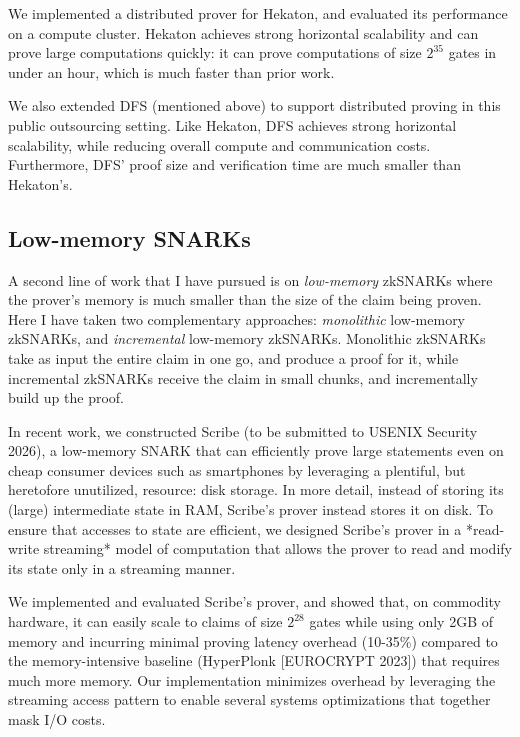\documentclass[11pt,letterpaper]{article}
\theoremstyle{definition} %
\theoremstyle{remark} %
\begin{document}
We implemented a distributed prover for Hekaton, and evaluated its performance on a compute cluster. Hekaton achieves strong horizontal scalability and can prove large computations quickly: it can prove computations of size $2^{35}$  gates in under an hour, which is much faster than prior work.

We also extended DFS (mentioned above) to support distributed proving in this public outsourcing setting. Like Hekaton, DFS achieves strong horizontal scalability, while reducing overall compute and communication costs.
Furthermore, DFS' proof size and verification time are much smaller than Hekaton's.


\subsection{Low-memory SNARKs}

A second line of work that I have pursued is on \emph{low-memory} zkSNARKs where the prover's memory is much smaller than the size of the claim being proven.
Here I have taken two complementary approaches: \emph{monolithic} low-memory zkSNARKs, and \emph{incremental} low-memory zkSNARKs.
Monolithic zkSNARKs take as input the entire claim in one go, and produce a proof for it, while incremental zkSNARKs receive the claim in small chunks, and incrementally build up the proof.

In recent work, we constructed Scribe (to be submitted to USENIX Security 2026), a low-memory SNARK that can efficiently prove large statements even on cheap consumer devices such as smartphones by leveraging a plentiful, but heretofore unutilized, resource: disk storage. 
In more detail, instead of storing its (large) intermediate state in RAM, Scribe's prover instead stores it on disk. 
To ensure that accesses to state are efficient, we designed Scribe's prover in a *read-write streaming* model of computation that allows the prover to read and modify its state only in a streaming manner.

We implemented and evaluated Scribe's prover, and showed that, on commodity hardware, it can easily scale to claims of size $2^{28}$ gates while using only 2GB of memory and incurring minimal proving latency overhead (10-35\%) compared to the memory-intensive baseline (HyperPlonk [EUROCRYPT 2023]) that requires much more memory. 
Our implementation minimizes overhead by leveraging the streaming access pattern to enable several systems optimizations that together mask I/O costs.
\end{document}
